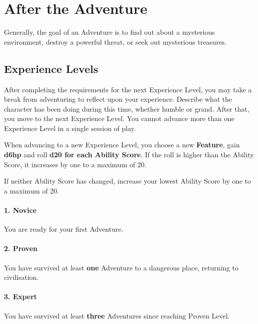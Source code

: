 \documentclass[itdr/core]{subfiles}
\begin{document}
\break

\section{After the Adventure}

Generally, the goal of an Adventure is to find out about a mysterious environment, destroy a powerful threat, or seek out mysterious treasures.

\vfill
\subsection{Experience Levels}
After completing the requirements for the next Experience Level, you may take a break from adventuring to reflect upon your experience. Describe what the character has been doing during this time, whether humble or grand. After that, you move to the next Experience Level. You cannot advance more than one Experience Level in a single session of play.

When advancing to a new Experience Level, you choose a new \textbf{Feature}, gain \textbf{d6hp} and roll \textbf{d20 for each Ability Score}. If the roll is higher than the Ability Score, it increases by one to a maximum of 20.

If neither Ability Score has changed, increase your lowest Ability Score by one to a maximum of 20.

\paragraph{1. Novice}
You are ready for your first Adventure.

\paragraph{2. Proven}
You have survived at least \textbf{one} Adventure to a dangerous place, returning to civilisation.

\paragraph{3. Expert}
You have survived at least \textbf{three} Adventures since reaching Proven Level.
\end{document}
